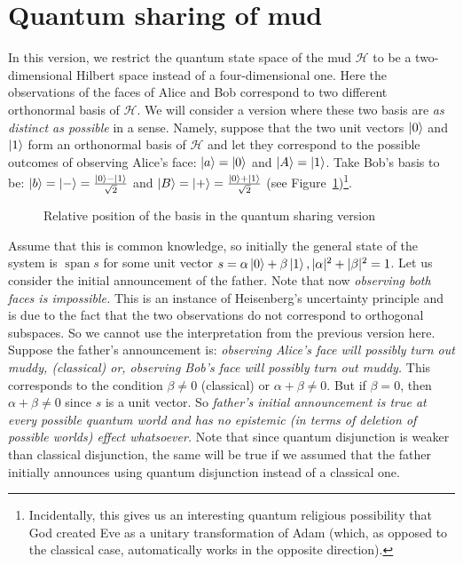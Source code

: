 \documentclass[a4paper]{article}
\newcommand{\HH}{\mathcal{H}}
\DeclareMathOperator{\spn}{span}
\begin{document}
\section*{Quantum sharing of mud}
In this version, we restrict the quantum state space of the mud $\HH$ to be a
two-dimensional Hilbert space instead of a four-dimensional one. Here the
observations of the faces of Alice and Bob correspond to two different
orthonormal basis of $\HH$. We will consider a version where these two basis are
\emph{as distinct as possible} in a sense. Namely, suppose that the two unit
vectors $\ket{0}$ and $\ket{1}$ form an orthonormal basis of $\HH$ and let they
correspond to the possible outcomes of observing Alice's face: $\ket{a} =
\ket{0}$ and $\ket{A} = \ket{1}$. Take Bob's basis to be: $\ket{b} = \ket{-} =
\frac{\ket{0} - \ket{1}}{\sqrt{2}}$ and $\ket{B} = \ket{+} = \frac{\ket{0} +
\ket{1}}{\sqrt{2}}$ (see Figure~\ref{fig:shab})\footnote{Incidentally, this
gives us an interesting quantum religious possibility that God created Eve as a
unitary transformation of Adam (which, as opposed to the classical case,
automatically works in the opposite direction).}.
\begin{figure}
    \centering
{}
    \caption{Relative position of the basis in the quantum sharing version}
    \label{fig:shab}
\end{figure}
Assume that this is common knowledge, so initially the general state of the
system is $\spn s$ for some unit vector $s = \alpha \ket{0} + \beta \ket{1},
|\alpha|^2 + |\beta|^2 = 1$.  Let us consider the initial announcement of the
father. Note that now \emph{observing both faces is impossible.} This is an
instance of Heisenberg's uncertainty principle and is due to the fact that the
two observations do not correspond to orthogonal subspaces. So we cannot use the
interpretation from the previous version here.  Suppose the father's
announcement is: \emph{observing Alice's face will possibly turn out muddy,
(classical) or, observing Bob's face will possibly turn out muddy.} This
corresponds to the condition $\beta \neq 0$ (classical) or $\alpha + \beta \neq
0$. But if $\beta = 0$, then $\alpha + \beta \neq 0$ since $s$ is a unit vector.
So \emph{father's initial announcement is true at every possible quantum world
    and has no epistemic (in terms of deletion of possible worlds) effect
whatsoever.} Note that since quantum disjunction is weaker than classical
disjunction, the same will be true if we assumed that the father initially
announces using quantum disjunction instead of a classical one.
\end{document}
